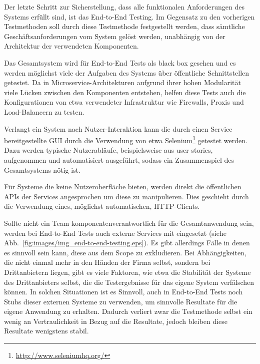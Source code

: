 \documentclass[12pt,a4paper,bibliography=totocnumbered,listof=totocnumbered]{scrartcl}
\begin{document}
Der letzte Schritt zur Sicherstellung, dass alle funktionalen Anforderungen des Systems erfüllt sind, ist das End-to-End Testing. Im Gegensatz zu den vorherigen Testmethoden soll durch diese Testmethode festgestellt werden, dass sämtliche Geschäftsanforderungen vom System gelöst werden, unabhängig von der Architektur der verwendeten Komponenten.~\cite{clemson}

Das Gesamtsystem wird für End-to-End Tests als black box gesehen und es werden möglichst viele der Aufgaben des Systems über öffentliche Schnittstellen getestet. Da in Microservice-Architekturen aufgrund ihrer hohen Modularität viele Lücken zwischen den Komponenten entstehen, helfen diese Tests auch die Konfigurationen von etwa verwendeter Infrastruktur wie Firewalls, Proxis und Load-Balancern zu testen.\cite{clemson}

Verlangt ein System nach Nutzer-Interaktion kann die durch einen Service bereitgestellte GUI durch die Verwendung von etwa Selenium\footnote{\url{http://www.seleniumhq.org/}} getestet werden. Dazu werden typische Nutzerabläufe, beispielsweise aus user stories, aufgenommen und automatisiert ausgeführt, sodass ein Zusammenspiel des Gesamtsystems nötig ist.\cite{clemson}

Für Systeme die keine Nutzeroberfläche bieten, werden direkt die öffentlichen \acp{API} der Services angesprochen um diese zu manipulieren. Dies geschieht durch die Verwendung eines, möglichst automatischen, HTTP-Clients.\cite{clemson}


Sollte nicht ein Team komponentenverantwortlich für die Gesamtanwendung sein,  werden bei End-to-End Tests auch externe Services mit eingesetzt (siehe Abb.~\ref{fig:images/img_end-to-end-testing.eps}). Es gibt allerdings Fälle in denen es sinnvoll sein kann, diese aus dem Scope zu exkludieren. Bei Abhängigkeiten, die nicht einmal mehr in den Händen der Firma selbst, sondern bei Drittanbietern liegen, gibt es viele Faktoren, wie etwa die Stabilität der Systeme des Drittanbieters selbst, die die Testergebnisse für das eigene System verfälschen können. In solchen Situationen ist es Sinnvoll, auch in End-to-End Tests noch Stubs dieser externen Systeme zu verwenden, um sinnvolle Resultate für die eigene Anwendung zu erhalten. Dadurch verliert zwar die Testmethode selbst ein wenig an Vertraulichkeit in Bezug auf die Resultate, jedoch bleiben diese Resultate wenigstens stabil.\cite{clemson}
\end{document}
